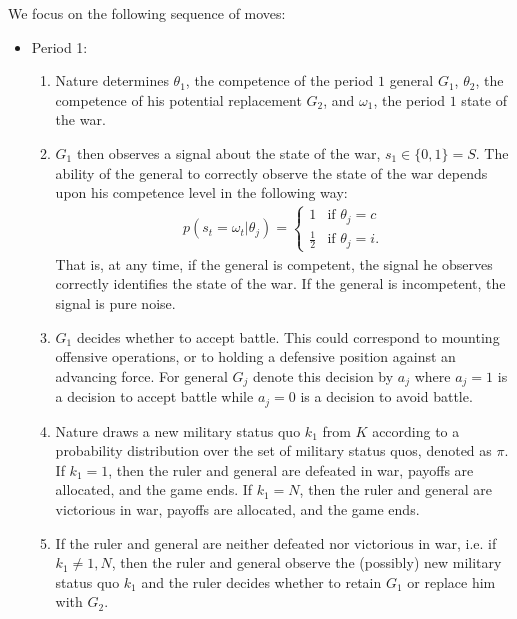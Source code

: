 \documentclass[11pt,]{article}
\begin{document}
We focus on the following sequence of moves:
\begin{itemize}
\item[] Period 1:
\begin{enumerate}
\item Nature determines $\theta_{1}$, the competence of the period $1$ general $G_1$, $\theta_{2}$, the competence of his potential replacement $G_2$, and $\omega_1$, the period $1$ state of the war.

\item $G_1$ then observes a signal about the state of the war, $s_1\in\{0,1\}=S$.  The ability of the general to correctly observe the state of the war depends upon his competence level in the following way: 
\begin{align*}
p(s_t=\omega_t|\theta_{j})=\left\{\begin{array}{ll}
1&\mbox{if }\theta_{j}=c\\
\frac{1}{2}&\mbox{if }\theta_{j}=i.
\end{array}\right.
\end{align*}That is, at any time, if the general is competent, the signal he observes correctly identifies the state of the war.  If the general is incompetent, the signal is pure noise.  

\item $G_1$ decides whether to accept battle. This could correspond to mounting offensive operations, or to holding a defensive position against an advancing force.  For general $G_j$ denote this decision by $a_j$ where $a_j=1$ is a decision to accept battle while $a_j=0$ is a decision to avoid battle.

\item Nature draws a new military status quo $k_1$ from $K$ according to a probability distribution over the set of military status quos, denoted as $\pi$.  If $k_1=1$, then the ruler and general are defeated in war, payoffs are allocated, and the game ends.  If $k_1=N$, then the ruler and general are victorious in war, payoffs are allocated, and the game ends.  

\item If the ruler and general are neither defeated nor victorious in war, i.e. if $k_1\neq1,N$, then the ruler and general observe the (possibly) new military status quo $k_1$ and the ruler decides whether to retain $G_1$ or replace him with $G_2$.
\end{enumerate}


\end{itemize}
\end{document}
